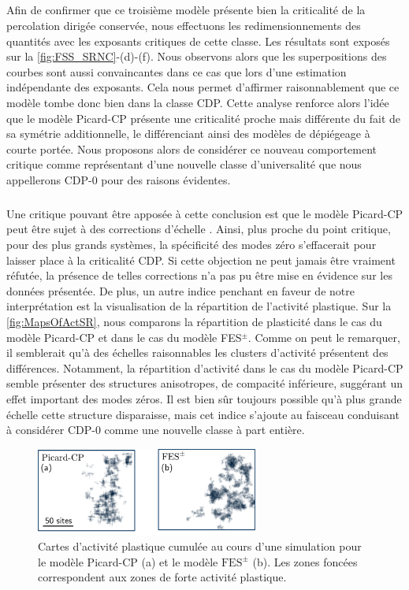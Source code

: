 \subparagraph{}Afin de confirmer que ce troisième modèle présente bien la criticalité de la percolation dirigée conservée, nous effectuons les redimensionnements des quantités avec les exposants critiques de cette classe. Les résultats sont exposés sur la \autoref{fig:FSS_SRNC}-(d)-(f). Nous observons alors que les superpositions des courbes sont aussi convaincantes dans ce cas que lors d'une estimation indépendante des exposants. Cela nous permet d'affirmer raisonnablement que ce modèle tombe donc bien dans la classe CDP. Cette analyse renforce alors l'idée que le modèle Picard-CP présente une criticalité proche mais différente du fait de sa symétrie additionnelle, le différenciant ainsi des modèles de dépiégeage à courte portée. Nous proposons alors de considérer ce nouveau comportement critique comme représentant d'une nouvelle classe d'universalité que nous appellerons CDP-0 pour des raisons évidentes.

\subparagraph{}Une critique pouvant être apposée à cette conclusion est que le modèle Picard-CP peut être sujet à des corrections d'échelle \cite{nishimori_elements_2015}. Ainsi, plus proche du point critique, pour des plus grands systèmes, la spécificité des modes zéro s'effacerait pour laisser place à la criticalité CDP. Si cette objection ne peut jamais être vraiment réfutée, la présence de telles corrections n'a pas pu être mise en évidence sur les données présentée. De plus, un autre indice penchant en faveur de notre interprétation est la visualisation de la répartition de l'activité plastique. Sur la \autoref{fig:MapsOfActSR}, nous comparons la répartition de plasticité dans le cas du modèle Picard-CP et dans le cas du modèle FES$^\pm$. Comme on peut le remarquer, il semblerait qu'à des échelles raisonnables les clusters d'activité présentent des différences. Notamment, la répartition d'activité dans le cas du modèle Picard-CP semble présenter des structures anisotropes, de compacité inférieure, suggérant un effet important des modes zéros. Il est bien sûr toujours possible qu'à plus grande échelle cette structure disparaisse, mais cet indice s'ajoute au faisceau conduisant à considérer CDP-0 comme une nouvelle classe à part entière.

\begin{figure}[h]
	\centering
	\includegraphics[width=0.65\textwidth]{Chapitre4/Figures/CourtePortee/MapsofActSR.pdf}
	\caption{Cartes d'activité plastique cumulée au cours d'une simulation pour le modèle Picard-CP (a) et le modèle $\text{FES}^\pm$ (b). Les zones foncées correspondent aux zones de forte activité plastique.}
	 \label{fig:MapsOfActSR}
\end{figure}

